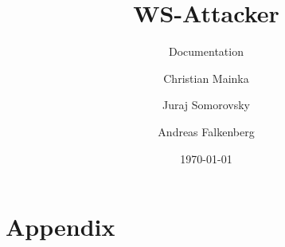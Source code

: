 \documentclass[a4paper,12pt,english,parskip=half,english]{scrartcl}
\title{WS-Attacker}
\subtitle{Documentation}
\author{Christian Mainka \and Juraj Somorovsky \and Andreas Falkenberg}
\date{\today}
\newcommand{\mysection}{}
\let\mysection=\section
\renewcommand{\section}{\pagebreak[4]\mysection}
\begin{document}
\maketitle

\begin{abstract}
    
\end{abstract}

\tableofcontents





\appendix
{}
\section*{Appendix}
\ihead[]{}
\let\section\subsection


\end{document}
